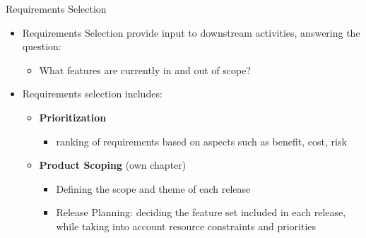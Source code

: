 \begin{Slide}{Requirements Selection}
\begin{itemize}
\item Requirements Selection provide input to downstream activities, answering the question: 
\begin{itemize}
\item What features are currently in and out of scope?
\end{itemize}
\item Requirements selection includes:
\begin{itemize}
\item \textbf{Prioritization} 
\begin{itemize}
\item ranking of requirements based on aspects such as benefit, cost, risk
\end{itemize}
\item \textbf{Product Scoping} (own chapter)
\begin{itemize}
\item Defining the scope and theme of each release
\item Release Planning: deciding the feature set included in each release, while taking into account resource constraints and priorities


\end{itemize}
\end{itemize}
\end{itemize}
\end{Slide}